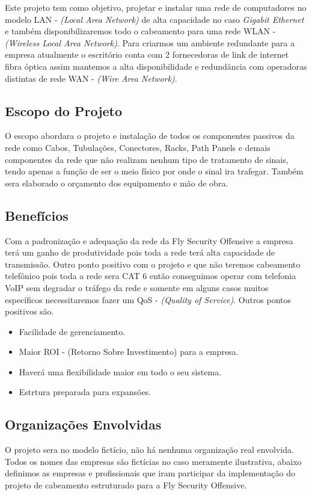 \documentclass[	DIV=calc,%
							paper=a4,%
							fontsize=12pt,%
							onecolumn]{scrartcl}	 					%
\begin{document}
\bigskip

Este projeto tem como objetivo, projetar e instalar uma rede de computadores no modelo LAN - \textit{(Local Area Network)} de alta capacidade no caso \textit{Gigabit Ethernet} e também disponibilizaremos todo o cabeamento para uma rede WLAN - \textit{(Wireless Local Area Network)}. Para criarmos um ambiente redundante para a empresa atualmente o escritório conta com 2 fornecedoras de link de internet fibra óptica assim mantemos a alta disponibilidade e redundância  com operadoras distintas de rede WAN - \textit{(Wire Area Network)}.

\subsection{Escopo do Projeto}
O escopo abordara o projeto e instalação de todos os componentes passivos da rede como Cabos, Tubulações, Conectores, Racks, Path Panels e demais componentes da rede que não realizam nenhum tipo de tratamento de sinais, tendo apenas a função de ser o meio físico por onde o sinal ira trafegar. Também sera elaborado o orçamento dos equipamento e mão de obra.    


\subsection{Benefícios}
Com a padronização e adequação da rede da Fly Security Offensive a empresa terá um ganho de produtividade pois toda a rede terá alta capacidade de transmissão. Outro ponto positivo com o projeto e que não teremos cabeamento telefônico pois toda a rede sera CAT 6 então conseguimos operar com telefonia VoIP sem degradar o tráfego da rede e somente em alguns casos muitos específicos necessitaremos fazer um QoS - \textit{(Quality of Service)}. Outros pontos positivos são.

\begin{itemize}
\item Facilidade de gerenciamento.
\item Maior ROI - (Retorno Sobre Investimento) para a empresa.
\item Haverá uma flexibilidade maior em todo o seu sistema. 
\item Estrtura preparada para expansões.
\end{itemize}

\subsection{Organizações Envolvidas}
O projeto sera no modelo fictício, não há nenhuma organização real envolvida. Todos os nomes das empresas são fictícias no caso meramente ilustrativa, abaixo definimos as empresas e profissionais que iram participar da implementação do projeto de cabeamento estruturado para a Fly Security Offensive.
\end{document}
